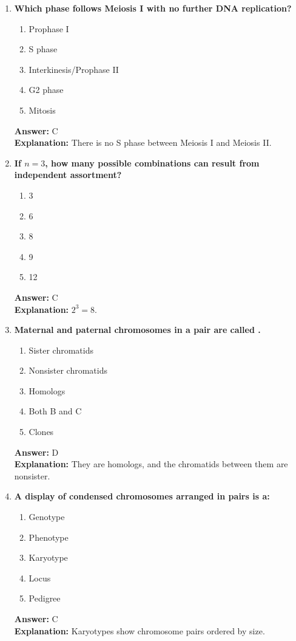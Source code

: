 \documentclass[11pt, a4paper]{article}
\begin{document}
\begin{enumerate}[leftmargin=*, label=\arabic*.]
\item \textbf{Which phase follows Meiosis I with no further DNA replication?}
\begin{enumerate}[label=\Alph*.]
\item Prophase I
\item S phase
\item Interkinesis/Prophase II
\item G2 phase
\item Mitosis
\end{enumerate}
\textbf{Answer:} C \\
\textbf{Explanation:} There is no S phase between Meiosis I and Meiosis II.

\item \textbf{If $n=3$, how many possible combinations can result from independent assortment?}
\begin{enumerate}[label=\Alph*.]
\item 3
\item 6
\item 8
\item 9
\item 12
\end{enumerate}
\textbf{Answer:} C \\
\textbf{Explanation:} $2^3 = 8$.

\item \textbf{Maternal and paternal chromosomes in a pair are called \underline{\hspace{1cm}}.}
\begin{enumerate}[label=\Alph*.]
\item Sister chromatids
\item Nonsister chromatids
\item Homologs
\item Both B and C
\item Clones
\end{enumerate}
\textbf{Answer:} D \\
\textbf{Explanation:} They are homologs, and the chromatids between them are nonsister.

\item \textbf{A display of condensed chromosomes arranged in pairs is a:}
\begin{enumerate}[label=\Alph*.]
\item Genotype
\item Phenotype
\item Karyotype
\item Locus
\item Pedigree
\end{enumerate}
\textbf{Answer:} C \\
\textbf{Explanation:} Karyotypes show chromosome pairs ordered by size.


\end{enumerate}
\end{document}
